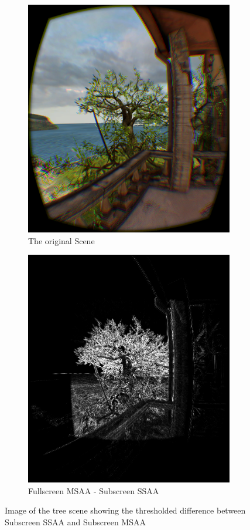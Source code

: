 \documentclass[12pt,a4paper,twoside,openright]{report}
\begin{document}
\begin{figure}
\begin{subfigure}{0.5\textwidth}
\includegraphics[width=0.9\linewidth]{figs/tree_msaa.png}
\caption{The original Scene}
\label{fig:subim2}
\end{subfigure}
\begin{subfigure}{0.5\textwidth}
\centerline{\includegraphics[width=0.9\linewidth]{figs/difftree.png}}
\caption{Fullscreen MSAA - Subscreen SSAA}
\label{ssaatree}
\end{subfigure}
 
\caption{Image of the tree scene showing the thresholded difference between Subscreen SSAA and Subscreen MSAA}
\label{fig:supersample}
\end{figure}
\end{document}
